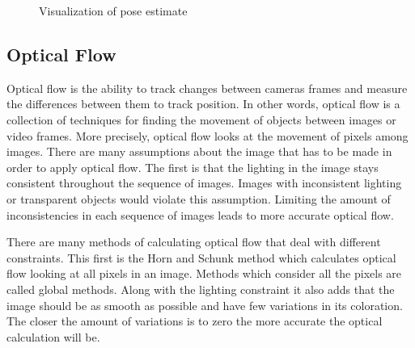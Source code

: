 \documentclass{article}
\begin{document}
      \begin{figure}%
        \centering
        \qquad
        \caption{Visualization of pose estimate}%
        \label{fig:example_aruco_detection}%
      \end{figure}


  \subsection{Optical Flow}

    Optical flow is the ability to track changes between cameras frames and measure the differences between them to track position. In other words, optical flow is a collection of techniques for finding the movement of objects between images or video frames. More precisely, optical flow looks at the movement of pixels among images. There are many assumptions about the image that has to be made in order to apply optical flow. The first is that the lighting in the image stays consistent throughout the sequence of images. Images with inconsistent lighting or transparent objects would violate this assumption. Limiting the amount of inconsistencies in each sequence of images leads to more accurate optical flow. %

    There are many methods of calculating optical flow that deal with different constraints. This first is the Horn and Schunk method which calculates optical flow looking at all pixels in an image. Methods which consider all the pixels are called global methods. Along with the lighting constraint it also adds that the image should be as smooth as possible and have few variations in its coloration. The closer the amount of variations is to zero the more accurate the optical calculation will be\cite{odonovan_optical_2005}.
\end{document}

